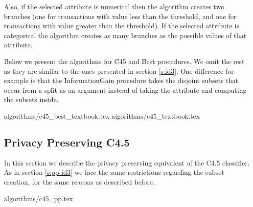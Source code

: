 Also, if the selected attribute is numerical then the algorithm creates two branches (one for transactions with value less than the threshold, and one for transactions with value greater than the threshold).
If the selected attribute is categorical the algorithm creates as many branches as the possible values of that attribute.

Below we present the algorithms for \f{C45} and \f{Best} procedures.
We omit the rest as they are similar to the ones presented in section \ref{s:id3}.
One difference for example is that the \f{InformationGain} procedure takes the disjoint subsets that occur from a split as an argument instead of taking the attribute and computing the subsets inside.

{algorithms/c45_best_textbook.tex}
{algorithms/c45_textbook.tex}

\subsection{Privacy Preserving C4.5}\label{s:pp-c45}
In this section we describe the privacy preserving equivalent of the C4.5 classifier.
As in section \ref{s:pp-id3} we face the same restrictions regarding the subset creation, for the same reasons as described before.


{algorithms/c45_pp.tex}
